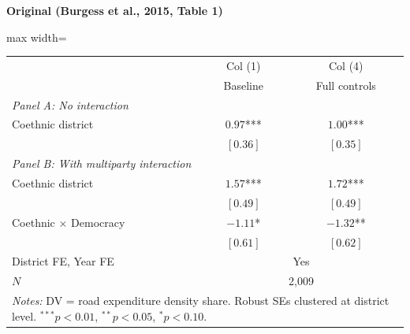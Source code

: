 \documentclass[11pt,a4paper]{article}
\begin{document}
\vspace{0.5cm}
\begin{minipage}[t]{0.48\textwidth}
\centering
\textbf{\large Original (Burgess et al., 2015, Table 1)}
\vspace{0.3cm}

\begin{adjustbox}{max width=\textwidth}
\begin{tabular}{lcc}
\toprule
 & Col (1) & Col (4) \\
 & Baseline & Full controls \\
\midrule
\multicolumn{3}{l}{\textit{Panel A: No interaction}} \\[3pt]
Coethnic district & $0.97$*** & $1.00$*** \\
 & $[0.36]$ & $[0.35]$ \\[0.3em]
\multicolumn{3}{l}{\textit{Panel B: With multiparty interaction}} \\[3pt]
Coethnic district & $1.57$*** & $1.72$*** \\
 & $[0.49]$ & $[0.49]$ \\
Coethnic $\times$ Democracy & $-1.11$* & $-1.32$** \\
 & $[0.61]$ & $[0.62]$ \\[0.3em]
\midrule
District FE, Year FE & \multicolumn{2}{c}{Yes} \\
$N$ & \multicolumn{2}{c}{2,009} \\
\bottomrule
\multicolumn{3}{p{0.95\textwidth}}{\footnotesize\textit{Notes:} DV = road expenditure density share. Robust SEs clustered at district level. $^{***}p<0.01$, $^{**}p<0.05$, $^{*}p<0.10$.}
\end{tabular}
\end{adjustbox}
\end{minipage}%
\hfill
\end{document}
